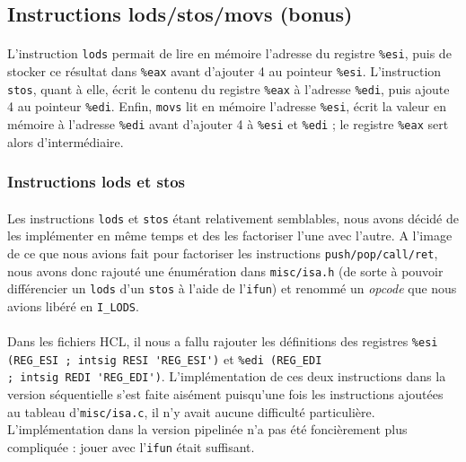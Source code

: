 \documentclass[12pt]{article}
\begin{document}
\subsection{Instructions lods/stos/movs (bonus)}
\paragraph{}L'instruction \verb+lods+ permait de lire en mémoire l'adresse du registre \verb+%esi+, puis de stocker ce résultat dans \verb+%eax+ avant d'ajouter 4 au pointeur \verb+%esi+. L'instruction \verb+stos+, quant à elle, écrit le contenu du registre \verb+%eax+ à l'adresse \verb+%edi+, puis ajoute 4 au pointeur \verb+%edi+. Enfin, \verb+movs+ lit en mémoire l'adresse \verb+%esi+, écrit la valeur en mémoire à l'adresse \verb+%edi+ avant d'ajouter 4 à \verb+%esi+ et \verb+%edi+ ; le registre \verb+%eax+ sert alors d'intermédiaire.


\subsubsection{Instructions lods et stos}
\paragraph{}Les instructions \verb+lods+ et \verb+stos+ étant relativement semblables, nous avons décidé de les implémenter en même temps et des les factoriser l'une avec l'autre. A l'image de ce que nous avions fait pour factoriser les instructions \verb+push/pop/call/ret+, nous avons donc rajouté une énumération dans \verb+misc/isa.h+ (de sorte à pouvoir différencier un \verb+lods+ d'un \verb+stos+ à l'aide de l'\verb+ifun+) et renommé un {\itshape opcode} que nous avions libéré en \verb+I_LODS+.

\paragraph{}Dans les fichiers HCL, il nous a fallu rajouter les définitions des registres \verb+%esi (REG_ESI ; intsig RESI 'REG_ESI')+ et \verb+%edi (REG_EDI+\\\verb+; intsig REDI 'REG_EDI')+. L'implémentation de ces deux instructions dans la version séquentielle s'est faite aisément puisqu'une fois les instructions ajoutées au tableau d'\verb+misc/isa.c+, il n'y avait aucune difficulté particulière. L'implémentation dans la version pipelinée n'a pas été foncièrement plus compliquée : jouer avec l'\verb+ifun+ était suffisant.
\end{document}
